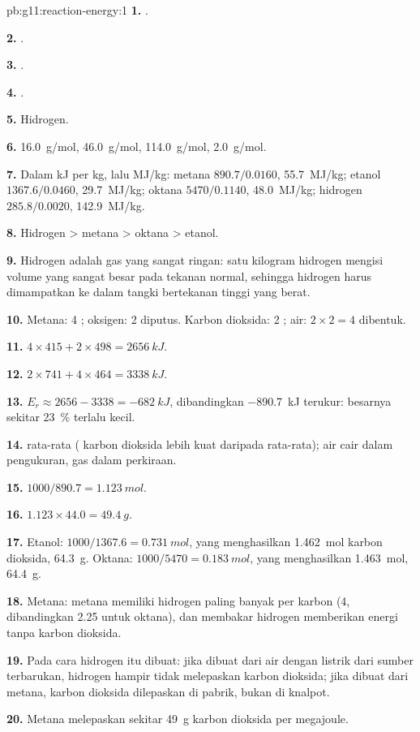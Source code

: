 \begin{solution}{pb:g11:reaction-energy:1}
\textbf{1.} .

\textbf{2.} .

\textbf{3.} .

\textbf{4.} .

\textbf{5.} Hidrogen.

\textbf{6.} \qty{16.0}{g/mol}, \qty{46.0}{g/mol}, \qty{114.0}{g/mol},
\qty{2.0}{g/mol}.

\textbf{7.} Dalam \si{kJ} per \si{kg}, lalu \si{MJ/kg}: metana
$890.7 / 0.0160$, \qty{55.7}{MJ/kg}; etanol $1367.6 / 0.0460$,
\qty{29.7}{MJ/kg}; oktana $5470 / 0.1140$, \qty{48.0}{MJ/kg}; hidrogen
$285.8 / 0.0020$, \qty{142.9}{MJ/kg}.

\textbf{8.} Hidrogen > metana > oktana > etanol.

\textbf{9.} Hidrogen adalah gas yang sangat ringan: satu kilogram
hidrogen mengisi volume yang sangat besar pada tekanan normal, sehingga
hidrogen harus dimampatkan ke dalam tangki bertekanan tinggi yang berat.

\textbf{10.} Metana: 4 ; oksigen: 2  diputus. Karbon
dioksida: 2 ; air: $2 \times 2 = 4$  dibentuk.

\textbf{11.} $4 \times 415 + 2 \times 498 = \qty{2656}{kJ}$.

\textbf{12.} $2 \times 741 + 4 \times 464 = \qty{3338}{kJ}$.

\textbf{13.} $E_r \approx 2656 - 3338 = \qty{-682}{kJ}$, dibandingkan
\qty{-890.7}{kJ} terukur: besarnya sekitar \qty{23}{\percent} terlalu
kecil.

\textbf{14.}  rata-rata ( karbon dioksida lebih
kuat daripada rata-rata); air cair dalam pengukuran, gas dalam
perkiraan.

\textbf{15.} $1000 / 890.7 = \qty{1.123}{mol}$.

\textbf{16.} $1.123 \times 44.0 = \qty{49.4}{g}$.

\textbf{17.} Etanol: $1000 / 1367.6 = \qty{0.731}{mol}$, yang
menghasilkan \qty{1.462}{mol} karbon dioksida, \qty{64.3}{g}. Oktana:
$1000 / 5470 = \qty{0.183}{mol}$, yang menghasilkan \qty{1.463}{mol},
\qty{64.4}{g}.

\textbf{18.} Metana: metana memiliki  hidrogen paling banyak per
 karbon (4, dibandingkan 2.25 untuk oktana), dan membakar hidrogen
memberikan energi tanpa karbon dioksida.

\textbf{19.} Pada cara hidrogen itu dibuat: jika dibuat dari air dengan
listrik dari sumber terbarukan, hidrogen hampir tidak melepaskan karbon
dioksida; jika dibuat dari metana, karbon dioksida dilepaskan di pabrik,
bukan di knalpot.

\textbf{20.} Metana melepaskan sekitar \qty{49}{g} karbon dioksida per
megajoule.
\end{solution}

